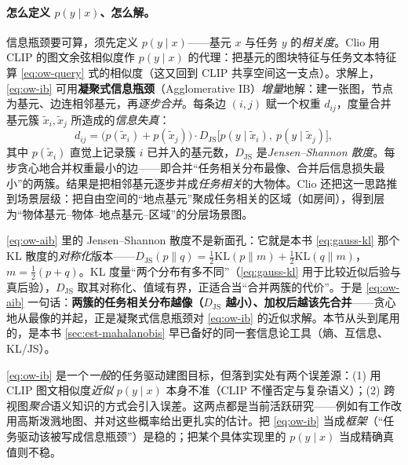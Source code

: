 \paragraph{怎么定义 $p(y\mid x)$、怎么解。}
信息瓶颈要可算，须先定义 $p(y\mid x)$——基元 $x$ 与任务 $y$ 的\emph{相关度}。Clio 用 CLIP 的图文余弦相似度作 $p(y\mid x)$ 的代理：把基元的图块特征与任务文本特征算 \cref{eq:ow-query} 式的相似度（这又回到 CLIP 共享空间这一支点）。求解上，\cref{eq:ow-ib} 可用\textbf{凝聚式信息瓶颈}（Agglomerative IB）\cite{slonim1999aib}\emph{增量}地解：建一张图，节点为基元、边连相邻基元，再\emph{逐步合并}。每条边 $(i,j)$ 赋一个权重 $d_{ij}$，度量合并基元簇 $\tilde{x}_i,\tilde{x}_j$ 所造成的\emph{信息失真}：
\begin{equation}
  d_{ij}=\big(p(\tilde{x}_i)+p(\tilde{x}_j)\big)\cdot D_{\mathrm{JS}}\!\big[p(y\mid\tilde{x}_i),\ p(y\mid\tilde{x}_j)\big],
  \label{eq:ow-aib}
\end{equation}
其中 $p(\tilde{x}_i)$ 直觉上记录簇 $i$ 已并入的基元数，$D_{\mathrm{JS}}$ 是\emph{Jensen--Shannon 散度}。每步贪心地合并权重最小的边——即合并“任务相关分布最像、合并后信息损失最小”的两簇。结果是把相邻基元逐步并成\emph{任务相关}的大物体。Clio 还把这一思路推到场景层级：把自由空间的“地点基元”聚成任务相关的区域（如房间），得到层为“物体基元--物体--地点基元--区域”的分层场景图。

\begin{insight}
\cref{eq:ow-aib} 里的 Jensen--Shannon 散度不是新面孔：它就是本书 \cref{eq:gauss-kl} 那个 KL 散度的\emph{对称化}版本——$D_{\mathrm{JS}}(p\|q)=\tfrac12\mathrm{KL}(p\|m)+\tfrac12\mathrm{KL}(q\|m)$，$m=\tfrac12(p+q)$。KL 度量“两个分布有多不同”（\cref{eq:gauss-kl} 用于比较近似后验与真后验），$D_{\mathrm{JS}}$ 取其对称化、值域有界，正适合当“合并两簇的代价”。于是 \cref{eq:ow-aib} 一句话：\textbf{两簇的任务相关分布越像（$D_{\mathrm{JS}}$ 越小）、加权后越该先合并}——贪心地从最像的并起，正是凝聚式信息瓶颈对 \cref{eq:ow-ib} 的近似求解。本节从头到尾用的，是本书 \cref{sec:est-mahalanobis} 早已备好的同一套信息论工具（熵、互信息、KL/JS）。
\end{insight}

\begin{pitfall}[信息瓶颈的两处误差来源]
\cref{eq:ow-ib} 是一个\emph{一般}的任务驱动建图目标，但落到实处有两个误差源\cite{paull2026openworld}：(1) 用 CLIP 图文相似度\emph{近似} $p(y\mid x)$ 本身不准（CLIP 不懂否定与复杂语义）；(2) 跨视图\emph{聚合}语义知识的方式会引入误差。这两点都是当前活跃研究——例如有工作改用高斯泼溅地图、并对这些概率给出更扎实的估计。把 \cref{eq:ow-ib} 当成\emph{框架}（“任务驱动该被写成信息瓶颈”）是稳的；把某个具体实现里的 $p(y\mid x)$ 当成精确真值则不稳。
\end{pitfall}


